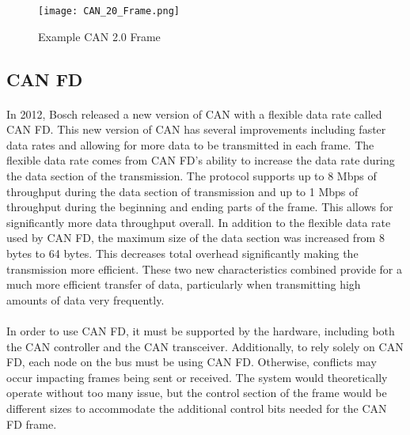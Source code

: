 \begin{figure}[H]
	\centering
	\texttt{[image: CAN\_20\_Frame.png]}
	\caption{Example CAN 2.0 Frame \cite{wikipediaCAN}}
	\label{fig:CANDataFrame}
\end{figure}

\subsection{CAN FD}

\paragraph{}
In 2012, Bosch released a new version of CAN with a flexible data rate called CAN FD\cite{BOSCH_CANFD}.
This new version of CAN has several improvements including faster data rates and allowing for more data to be transmitted in each frame.
The flexible data rate comes from CAN FD's ability to increase the data rate during the data section of the transmission.
The protocol supports up to 8 Mbps of throughput during the data section of transmission and up to 1 Mbps of throughput during the beginning and ending parts of the frame.
This allows for significantly more data throughput overall.
In addition to the flexible data rate used by CAN FD, the maximum size of the data section was increased from 8 bytes to 64 bytes.
This decreases total overhead significantly making the transmission more efficient.
These two new characteristics combined provide for a much more efficient transfer of data, particularly when transmitting high amounts of data very frequently.

\paragraph{}
In order to use CAN FD, it must be supported by the hardware, including both the CAN controller and the CAN transceiver.
Additionally, to rely solely on CAN FD, each node on the bus must be using CAN FD.
Otherwise, conflicts may occur impacting frames being sent or received.
The system would theoretically operate without too many issue, but the control section of the frame would be different sizes to accommodate the additional control bits needed for the CAN FD frame.